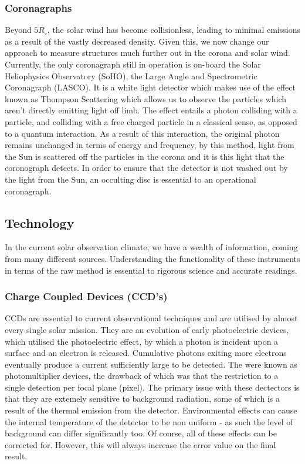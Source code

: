 \subsubsection{Coronagraphs}

Beyond $5 R_\circ$, the solar wind has become collisionless, leading to minimal emissions as a result of the vastly decreased density.
Given this, we now change our approach to measure structures much further out in the corona and solar wind.
Currently, the only coronagraph still in operation is on-board the Solar Heliophysics Observatory (SoHO), the Large Angle and Spectrometric Coronagraph (LASCO). 
It is a white light detector which makes use of the effect known as Thompson Scattering which allows us to observe the particles which aren't directly emitting light off limb.
The effect entails a photon colliding with a particle, and colliding with a free charged particle in a classical sense, as opposed to a quantum interaction.
As a result of this interaction, the original photon remains unchanged in terms of energy and frequency, by this method, light from the Sun is scattered off the particles in the corona and it is this light that the coronograph detects.
In order to ensure that the detector is not washed out by the light from the Sun, an occulting disc is essential to an operational coronagraph.


\subsection{Technology}

In the current solar observation climate, we have a wealth of information, coming from many different sources.
Understanding the functionality of these instruments in terms of the raw method is essential to rigorous science and accurate readings.

\subsubsection{Charge Coupled Devices (CCD's)}

CCDs are essential to current observational techniques and are utilised by almost every single solar mission.
They are an evolution of early photoelectric devices, which utilised the photoelectric effect, by which a photon is incident upon a surface and an electron is released.
Cumulative photons exiting more electrons eventually produce a current sufficiently large to be detected.
The were known as photomultiplier devices, the drawback of which was that the restriction to a single detection per focal plane (pixel).
The primary issue with these dectectors is that they are extemely sensitive to background radiation, some of which is a result of the thermal emission from the detector.
Environmental effects can cause the internal temperature of the detector to be non uniform - as such the level of background can differ significantly too.
Of course, all of these effects can be corrected for.
However, this will always increase the error value on the final result.

